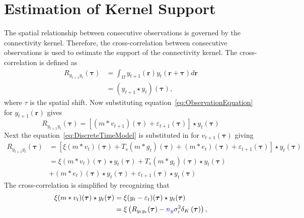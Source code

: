 \documentclass[]{article}
\newcommand{\parham}[1]{\textsf{\emph{\textbf{\textcolor{blue}{#1}}}}}
\begin{document}
\section*{Estimation of Kernel Support}
The spatial relationship between consecutive observations is governed by the connectivity kernel. Therefore, the cross-correlation between consecutive observations is used to estimate the support of the connectivity kernel. The cross-correlation is defined as
\begin{align}
	R_{y_{t+1}y_t}(\boldsymbol{\tau})& =\int_{\Omega} y_{t+1}(\mathbf{r}) y_t(\mathbf{r}+\boldsymbol{\tau}) d\mathbf{r}
 \nonumber \\
 &=(y_{t+1} \star y_t)(\boldsymbol\tau),
\end{align}
where $\tau$ is the spatial shift.  Now substituting equation~\ref{eq:ObservationEquation} for $y_{t+1}(\mathbf{r})$  gives 
\begin{equation}
	R_{y_{t+1}y_t}(\boldsymbol{\tau}) = \left[  (m\ast v_{t+1})(\boldsymbol\tau)+\varepsilon_{t+1}(\boldsymbol\tau)\right] \star  y_t(\boldsymbol{\tau}) 
\end{equation}
Next the equation~\ref{eq:DiscreteTimeModel} is substituted in for $v_{t+1}(\boldsymbol\tau)$ giving 
\begin{align}\label{eq:CrossCorrKernel}
	R_{y_{t+1}y_t}(\boldsymbol{\tau}) &= \left[  \xi(m\ast v_{t})(\boldsymbol\tau)+T_s(m\ast g_{t})(\boldsymbol\tau)+(m\ast e_{t})(\boldsymbol{\tau})+\varepsilon_{t+1}(\boldsymbol\tau)\right] \star  y_t(\boldsymbol{\tau}) \nonumber \\
&=\xi(m\ast v_{t})(\boldsymbol\tau)\star y_t(\boldsymbol\tau)+T_s(m\ast g_t)(\boldsymbol\tau)\star y_t(\boldsymbol\tau) \nonumber \\
&+(m\ast  e_t)(\boldsymbol\tau) \star y_t(\boldsymbol\tau)+\varepsilon_{t+1}(\boldsymbol\tau) \star y_t(\boldsymbol\tau)
\end{align}
The cross-correlation is simplified by recognizing that 
\begin{align}
\xi(m\ast v_{t})(\boldsymbol\tau)\star y_t(\boldsymbol\tau)&=\xi(y_t-\varepsilon_t)(\boldsymbol\tau) \star y_t(\boldsymbol\tau)\nonumber \\
&=\xi \left(R_{y_ty_t}(\boldsymbol{\tau})-\parham{$n_y$}\sigma_{\epsilon}^2  \delta_{K}\left(\boldsymbol\tau\right)\right),
\end{align}
\end{document}

